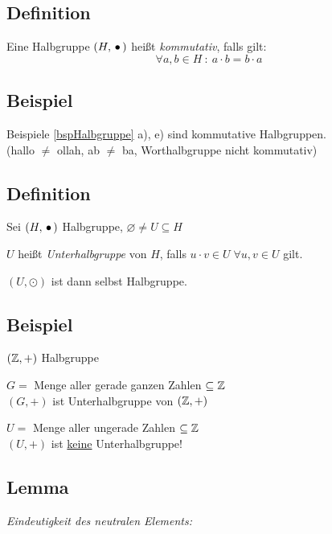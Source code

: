  
 \subsection[Definition: kommutative Halbgruppe]{Definition}
 
 Eine Halbgruppe $(H, \,{\bullet}\,)$ heißt \emph{kommutativ}, falls gilt:
 \[ \tag{Kommutativgesetz, KG}
 \forall a, b \in H\::\: a \cdot b = b \cdot a \]
 
 \subsection{Beispiel}
 
 Beispiele \ref{bspHalbgruppe} a), e) sind kommutative Halbgruppen.
 \\ (hallo $\neq$ ollah, ab $\neq$ ba, Worthalbgruppe nicht kommutativ) 
 
 \subsection[Definition: Unterhalbgruppe]{Definition}
 
 Sei $(H, \,{\bullet}\,)$ Halbgruppe, $\varnothing \neq U \subseteq H$
 
 $U$ heißt \emph{Unterhalbgruppe} von $H$, falls $u \cdot v \in U \; \forall u, v \in U$ gilt.
 
 $(U, \odot)$ ist dann selbst Halbgruppe.
 
 \subsection{Beispiel}
 
 $(\mathbb{Z}, +)$ Halbgruppe
 
 $G =$ Menge aller gerade ganzen Zahlen $\subseteq \mathbb{Z}$
 \\$(G, +)$ ist Unterhalbgruppe von $(\mathbb{Z}, +)$
 
 $U =$ Menge aller ungerade Zahlen $\subseteq \mathbb{Z}$
 \\$(U, +)$ ist \underline{keine} Unterhalbgruppe!
 
 \subsection[Lemma: Eins eindeutig]{Lemma} \label{nullelemEindeutig}
 
 \emph{Eindeutigkeit des neutralen Elements:}
 
